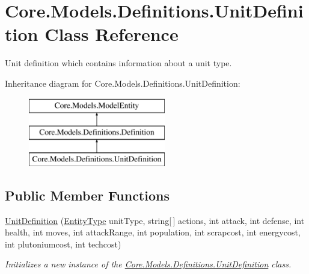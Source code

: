 \hypertarget{classCore_1_1Models_1_1Definitions_1_1UnitDefinition}{}\section{Core.\+Models.\+Definitions.\+Unit\+Definition Class Reference}
\label{classCore_1_1Models_1_1Definitions_1_1UnitDefinition}


Unit definition which contains information about a unit type.  


Inheritance diagram for Core.\+Models.\+Definitions.\+Unit\+Definition\+:\begin{figure}[H]
\begin{center}
\leavevmode
\includegraphics[height=3.000000cm]{classCore_1_1Models_1_1Definitions_1_1UnitDefinition}
\end{center}
\end{figure}
\subsection*{Public Member Functions}
\begin{DoxyCompactItemize}
\item 
\hyperlink{classCore_1_1Models_1_1Definitions_1_1UnitDefinition_a4556a0d5a8520d4133696961add95887}{Unit\+Definition} (\hyperlink{namespaceCore_1_1Models_1_1Definitions_a609ed13db028308ebc6c5fbd98615fdc}{Entity\+Type} unit\+Type, string\mbox{[}$\,$\mbox{]} actions, int attack, int defense, int health, int moves, int attack\+Range, int population, int scrapcost, int energycost, int plutoniumcost, int techcost)
\begin{DoxyCompactList}\small\item\em Initializes a new instance of the \hyperlink{classCore_1_1Models_1_1Definitions_1_1UnitDefinition}{Core.\+Models.\+Definitions.\+Unit\+Definition} class. \end{DoxyCompactList}\end{DoxyCompactItemize}
